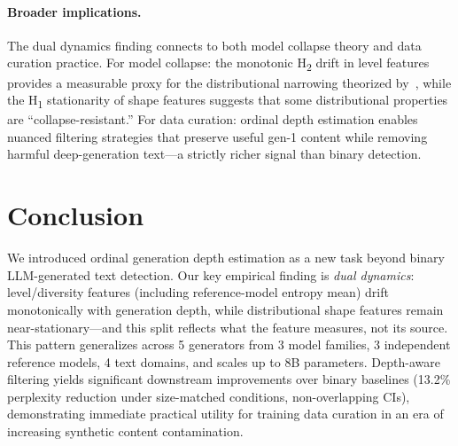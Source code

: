 \documentclass[letterpaper]{article}
\newcommand{\htwo}{H\textsubscript{2}}
\newcommand{\hone}{H\textsubscript{1}}
\begin{document}
\paragraph{Broader implications.}
The dual dynamics finding connects to both model collapse theory and data curation practice.
For model collapse: the monotonic \htwo{} drift in level features provides a measurable proxy for the distributional narrowing theorized by~\citet{shumailov2024model}, while the \hone{} stationarity of shape features suggests that some distributional properties are ``collapse-resistant.''
For data curation: ordinal depth estimation enables nuanced filtering strategies that preserve useful gen-1 content while removing harmful deep-generation text---a strictly richer signal than binary detection.

\section{Conclusion}

We introduced ordinal generation depth estimation as a new task beyond binary LLM-generated text detection.
Our key empirical finding is \emph{dual dynamics}: level/diversity features (including reference-model entropy mean) drift monotonically with generation depth, while distributional shape features remain near-stationary---and this split reflects what the feature measures, not its source.
This pattern generalizes across 5 generators from 3 model families, 3 independent reference models, 4 text domains, and scales up to 8B parameters.
Depth-aware filtering yields significant downstream improvements over binary baselines (13.2\% perplexity reduction under size-matched conditions, non-overlapping CIs), demonstrating immediate practical utility for training data curation in an era of increasing synthetic content contamination.


\end{document}
